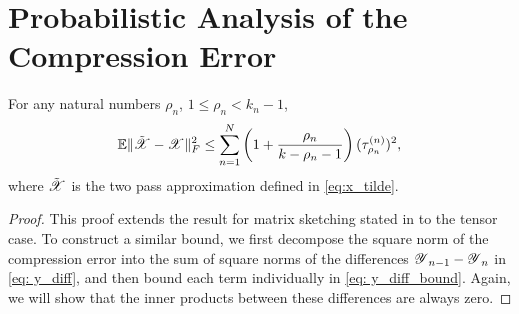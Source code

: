 \section{Probabilistic Analysis of the Compression Error}

\begin{lem}
\label{lemma: compression_error}
For any natural numbers $\rho_n$, $1\le \rho_n<k_n-1$,
\begin{equation}
\mathbb{E}  \|\tilde{\T{X}} - \T{X}\|_F^2 \le \sum_{n=1}^N \left(1+\frac{\rho_n}{k-\rho_n-1}\right)(\tau^{(n)}_{\rho_n})^2,\nonumber
\end{equation}
where $\tilde{\T{X}}$ is the two pass approximation defined in \eqref{eq:x_tilde}.
\begin{proof}
This proof extends the result for matrix sketching stated in \cite{halko2011finding} to the tensor case.
To construct a similar bound, we first decompose the square norm of the compression error
into the sum of square norms of the differences $\T{Y}_{n-1} - \T{Y}_{n}$ in \eqref{eq: y_diff},
and then bound each term individually in \eqref{eq: y_diff_bound}.
Again, we will show that the inner products between these differences are always zero.


\end{proof}
\end{lem}
